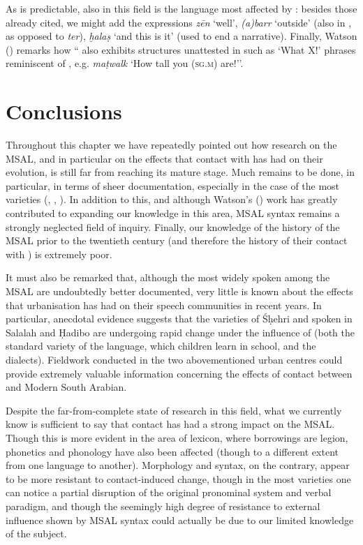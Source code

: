 \documentclass[output=paper]{langsci/langscibook}
\begin{document}
As is predictable, also in this field  is the language most affected by : besides those already cited, we might add the expressions \textit{zēn} ‘well’, \textit{(a)barr} ‘outside’ (also in , as opposed to  \textit{ter}), \textit{ḫalaṣ} ‘and this is it’ (used to end a narrative). Finally, Watson (\citeyear[3]{Watson2012}) remarks how `` also exhibits structures unattested in  such as ‘What X!’ phrases reminiscent of , e.g. \textit{maṭwalk} ‘How tall you (\textsc{sg.m}) are!’’.

\section{Conclusions}\label{sec:4}

Throughout this chapter we have repeatedly pointed out how research on the MSAL, and in particular on the effects that contact with  has had on their evolution, is still far from reaching its mature stage. Much remains to be done, in particular, in terms of sheer documentation, especially in the case of the most  varieties (, , ). In addition to this, and although Watson’s (\citeyear{Watson2012}) work has greatly contributed to expanding our knowledge in this area, MSAL syntax remains a strongly neglected field of inquiry. Finally, our knowledge of the history of the MSAL prior to the twentieth century (and therefore the history of their contact with ) is extremely poor. 

It must also be remarked that, although the most widely spoken among the MSAL are undoubtedly better documented, very little is known about the effects that urbanisation has had on their speech communities in recent years. In particular, anecdotal evidence suggests that the varieties of Śḥehri and  spoken in Salalah and Ḥadibo are undergoing rapid change under the influence of  (both the standard variety of the language, which children learn in school, and the dialects). Fieldwork conducted in the two abovementioned urban centres could provide extremely valuable information concerning the effects of contact between  and Modern South Arabian.

Despite the far-from-complete state of research in this field, what we currently know is sufficient to say that contact has had a strong impact on the MSAL. Though this is more evident in the area of lexicon, where borrowings are legion, phonetics and phonology have also been affected (though to a different extent from one language to another). Morphology and syntax, on the contrary, appear to be more resistant to contact-induced change, though in the most  varieties one can notice a partial disruption of the original pronominal system and verbal paradigm, and though the seemingly high degree of resistance to external influence shown by MSAL syntax could actually be due to our limited knowledge of the subject.
\end{document}
